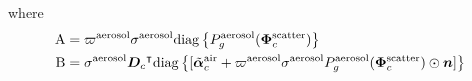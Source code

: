 \documentclass[10pt,letterpaper]{article}
\newcommand{\OpDiag}[1]{\mathrm{diag}\left\{#1\right\}}
\newcommand{\abbrev}[1]{\rm{#1}}
\newcommand{\vect}[1]{\bm{#1}}
\newcommand{\transpose}[1]{{#1}^\intercal}
\begin{document}
where
\begin{align}
  \label{eq:gradient3}
  \abbrev{A} &= \varpi^{\rm aerosol}\sigma^{\rm aerosol}
  \OpDiag{ P_g^{\rm aerosol}(\vect{\Phi}^{\rm scatter}_c)} \nonumber\\
  \abbrev{B} &= {\sigma}^{\rm aerosol}\transpose{{\bm D}_c} %
      \OpDiag{[\tilde{\vect{\alpha}}^{\rm air}_c + \varpi^{\rm
      aerosol}\sigma^{\rm aerosol} P^{\rm aerosol}_g(\vect{\Phi}^{\rm
      scatter}_c) \odot{\bm n}
    ]} 
\end{align}

\end{document}
